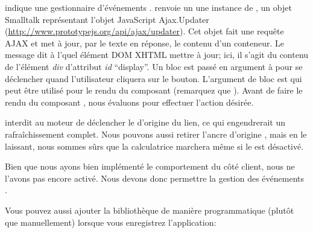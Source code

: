 \documentclass[a4paper,10pt,twoside]{book}
\begin{document}
 indique une gestionnaire d'événements
\ind{\jscript}.
 renvoie un \updater \ie une instance de
, un objet Smalltalk représentant l'objet JavaScript
Ajax.Updater (\url{http://www.prototypejs.org/api/ajax/updater}).
Cet objet fait une requête AJAX et met à jour, par le texte en
réponse, le contenu d'un conteneur.
Le message  dit à l'\updater quel élément DOM XHTML mettre à jour; ici,
il s'agit du contenu de l'élément \emph{div} d'attribut \emph{id}
``display''.
Un bloc est passé en argument à  pour se déclencher
quand l'utilisateur cliquera sur le bouton.
L'argument de bloc  est  qui peut être utilisé pour le rendu du composant
(remarquez que ).
Avant de faire le rendu du composant , nous évaluons
 pour effectuer l'action désirée.

 interdit au moteur \jscript de déclencher le
\callback d'origine du lien, ce qui engendrerait un rafraîchissement
complet. %
Nous pouvons aussi retirer l'ancre d'origine , mais en
le laissant, nous sommes sûrs que la calculatrice marchera même si le
\jscript est désactivé.


Bien que nous ayons bien implémenté le comportement du côté client,
nous ne l'avons pas encore activé.
Nous devons donc permettre la gestion des événements \jscript.


Vous pouvez aussi ajouter la bibliothèque de manière programmatique
(plutôt que manuellement) lorsque vous enregistrez l'application:
\begin{code}{}
MyCalculator class>>>initialize
	(self registerAsApplication: 'rpn')
		addLibrary: SULibrary}}
\end{code}
\end{document}
